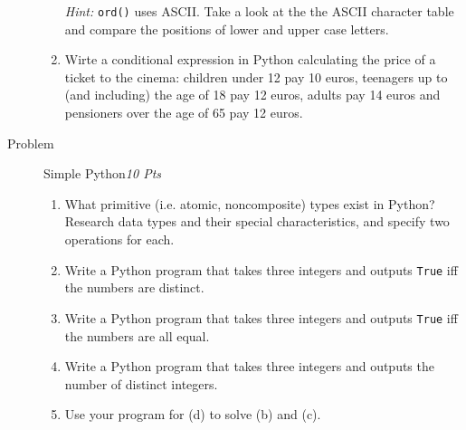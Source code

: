 \documentclass[a4paper,twoside,12pt]{article}
\newcounter{AUFGNR}
\newcommand{\AUFGABE}[2]{\vspace{0.3cm}\item[Problem \arabic{AUFGNR}]\stepcounter{AUFGNR} #1\hfill\emph{#2}}
\begin{document}
\begin{description}
\begin{enumerate}
\emph{Hint:} \texttt{ord()} uses ASCII. Take a look at the the ASCII character table and compare the positions of lower and upper case letters. 
\item Wirte a conditional expression in Python calculating the price of a ticket to the cinema: children under 12 pay 10 euros, teenagers up to (and including) the age of 18 pay 12 euros, adults pay 14 euros and pensioners over the age of 65 pay 12 euros.
\end{enumerate}

\AUFGABE{Simple Python}{10 Pts}

\begin{enumerate}
\item What primitive (i.e. atomic, noncomposite) types exist in Python? Research data types and their special characteristics,  and specify two operations for each.
\item Write a Python program that takes three integers and outputs \texttt{True} iff the numbers are distinct.
\item Write a Python program that takes three integers and outputs \texttt{True} iff the numbers are all equal.
\item Write a Python program that takes three integers and outputs the number of distinct integers.
\item Use your program for (d) to solve (b) and (c).
 \end{enumerate}

\end{description}
\end{document}
